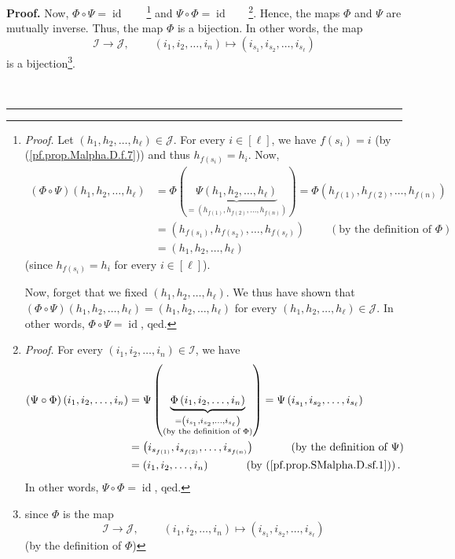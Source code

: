 \documentclass[numbers=enddot,12pt,final,onecolumn,notitlepage,abstracton]{scrartcl}
\theoremstyle{definition}
\newenvironment{proof}[1][Proof]{\noindent\textbf{#1.} }{\ \rule{0.5em}{0.5em}}
\newenvironment{verlong}{}{}
\begin{document}
\begin{verlong}
\begin{footnotesize}
\begin{proof}
Now, $\Phi\circ\Psi=\operatorname*{id}$\ \ \ \ \footnote{\textit{Proof.} Let
$\left(  h_{1},h_{2},\ldots,h_{\ell}\right)  \in\mathcal{J}$. For every
$i\in\left[  \ell\right]  $, we have $f\left(  s_{i}\right)  =i$ (by
(\ref{pf.prop.Malpha.D.f.7})) and thus $h_{f\left(  s_{i}\right)  }=h_{i}$.
Now,%
\begin{align*}
\left(  \Phi\circ\Psi\right)  \left(  h_{1},h_{2},\ldots,h_{\ell}\right)   &
=\Phi\left(  \underbrace{\Psi\left(  h_{1},h_{2},\ldots,h_{\ell}\right)
}_{=\left(  h_{f\left(  1\right)  },h_{f\left(  2\right)  },\ldots,h_{f\left(
n\right)  }\right)  }\right)  =\Phi\left(  h_{f\left(  1\right)  },h_{f\left(
2\right)  },\ldots,h_{f\left(  n\right)  }\right) \\
&  =\left(  h_{f\left(  s_{1}\right)  },h_{f\left(  s_{2}\right)  }%
,\ldots,h_{f\left(  s_{\ell}\right)  }\right)  \ \ \ \ \ \ \ \ \ \ \left(
\text{by the definition of }\Phi\right) \\
&  =\left(  h_{1},h_{2},\ldots,h_{\ell}\right)
\end{align*}
(since $h_{f\left(  s_{i}\right)  }=h_{i}$ for every $i\in\left[  \ell\right]
$).
\par
Now, forget that we fixed $\left(  h_{1},h_{2},\ldots,h_{\ell}\right)  $. We
thus have shown that $\left(  \Phi\circ\Psi\right)  \left(  h_{1},h_{2}%
,\ldots,h_{\ell}\right)  =\left(  h_{1},h_{2},\ldots,h_{\ell}\right)  $ for
every $\left(  h_{1},h_{2},\ldots,h_{\ell}\right)  \in\mathcal{J}$. In other
words, $\Phi\circ\Psi=\operatorname*{id}$, qed.} and $\Psi\circ\Phi
=\operatorname*{id}$ \ \ \ \footnote{\textit{Proof.} For every $\left(
i_{1},i_{2},\ldots,i_{n}\right)  \in\mathcal{I}$, we have%
\begin{align*}
\left(  \Psi\circ\Phi\right)  \left(  i_{1},i_{2},\ldots,i_{n}\right)   &
=\Psi\left(  \underbrace{\Phi\left(  i_{1},i_{2},\ldots,i_{n}\right)
}_{\substack{=\left(  i_{s_{1}},i_{s_{2}},\ldots,i_{s_{\ell}}\right)
\\\text{(by the definition of }\Phi\text{)}}}\right)  =\Psi\left(  i_{s_{1}%
},i_{s_{2}},\ldots,i_{s_{\ell}}\right) \\
&  =\left(  i_{s_{f\left(  1\right)  }},i_{s_{f\left(  2\right)  }}%
,\ldots,i_{s_{f\left(  n\right)  }}\right)  \ \ \ \ \ \ \ \ \ \ \left(
\text{by the definition of }\Psi\right) \\
&  =\left(  i_{1},i_{2},\ldots,i_{n}\right)  \ \ \ \ \ \ \ \ \ \ \left(
\text{by (\ref{pf.prop.SMalpha.D.sf.1})}\right)  .
\end{align*}
In other words, $\Psi\circ\Phi=\operatorname*{id}$, qed.}. Hence, the maps
$\Phi$ and $\Psi$ are mutually inverse. Thus, the map $\Phi$ is a bijection.
In other words, the map
\[
\mathcal{I}\rightarrow\mathcal{J},\ \ \ \ \ \ \ \ \ \ \left(  i_{1}%
,i_{2},\ldots,i_{n}\right)  \mapsto\left(  i_{s_{1}},i_{s_{2}},\ldots
,i_{s_{\ell}}\right)
\]
is a bijection\footnote{since $\Phi$ is the map
\[
\mathcal{I}\rightarrow\mathcal{J},\ \ \ \ \ \ \ \ \ \ \left(  i_{1}%
,i_{2},\ldots,i_{n}\right)  \mapsto\left(  i_{s_{1}},i_{s_{2}},\ldots
,i_{s_{\ell}}\right)
\]
(by the definition of $\Phi$)}.


\end{proof}
\end{footnotesize}
\end{verlong}
\end{document}
